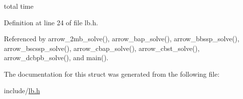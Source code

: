 total time 

Definition at line 24 of file lb.h.

Referenced by arrow\_\-2mb\_\-solve(), arrow\_\-bap\_\-solve(), arrow\_\-bbssp\_\-solve(), arrow\_\-bscssp\_\-solve(), arrow\_\-cbap\_\-solve(), arrow\_\-cbst\_\-solve(), arrow\_\-dcbpb\_\-solve(), and main().

The documentation for this struct was generated from the following file:\begin{CompactItemize}
\item 
include/\hyperlink{lb_8h}{lb.h}\end{CompactItemize}
